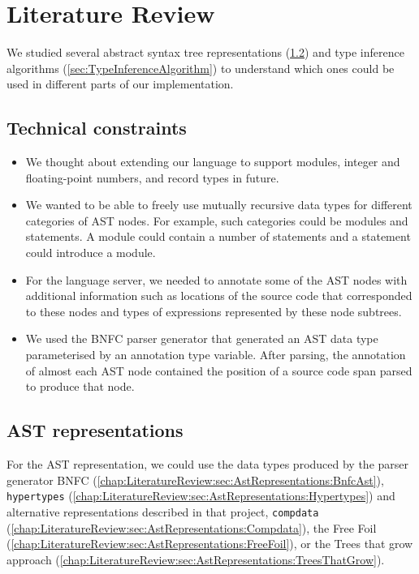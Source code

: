 \chapter{Literature Review}
\label{chap:LiteratureReview}

We studied several abstract syntax tree representations (\cref{sec:AstRepresentations}) and type inference algorithms (\cref{sec:TypeInferenceAlgorithm}) to understand which ones could be used in different parts of our implementation.

\section{Technical constraints}
\label{chap:LiteratureReview:sec:AstRepresentations:TechnicalConstraints}

\begin{itemize}
    \item We thought about extending our language to support modules, integer and floating-point numbers, and record types in future.
    \item We wanted to be able to freely use mutually recursive data types for different categories of AST nodes. For example, such categories could be modules and statements. A module could contain a number of statements and a statement could introduce a module.
    \item For the language server, we needed to annotate some of the AST nodes with additional information such as locations of the source code that corresponded to these nodes and types of expressions represented by these node subtrees.
    \item We used the BNFC parser generator that generated an AST data type parameterised by an annotation type variable.
          After parsing, the annotation of almost each AST node contained the position of a source code span parsed to produce that node.
\end{itemize}

\section{AST representations}
\label{sec:AstRepresentations}

For the AST representation, we could use the data types produced by the parser generator BNFC (\cref{chap:LiteratureReview:sec:AstRepresentations:BnfcAst}), \texttt{hypertypes} (\cref{chap:LiteratureReview:sec:AstRepresentations:Hypertypes}) and alternative representations described in that project, \texttt{compdata} (\cref{chap:LiteratureReview:sec:AstRepresentations:Compdata}), the Free Foil (\cref{chap:LiteratureReview:sec:AstRepresentations:FreeFoil}), or the Trees that grow approach (\cref{chap:LiteratureReview:sec:AstRepresentations:TreesThatGrow}).

